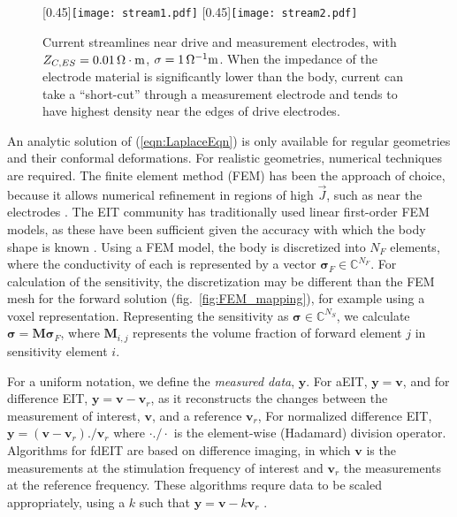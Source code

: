 \documentclass[10pt,journal]{IEEEtran}\def\TBLWIDA{15mm}\def\TBLWIDB{60mm}
\newcommand\fref[1]{fig.\ \ref{#1}}
\newcommand{\yB}{\mathbf{y}}
\newcommand{\vB}{\mathbf{v}}
\newcommand{\MB}{\mathbf{M}}
\newcommand{\sG}{\bm{\sigma}}
\begin{document}
\begin{figure}
\centering
   [0.45\columnwidth]{\texttt{[image: stream1.pdf]}}\hfil
   [0.45\columnwidth]{\texttt{[image: stream2.pdf]}}\\
\caption{%
Current streamlines near drive and measurement electrodes, with
$Z_{C,ES} = 0.01\,\Omega\cdot{\rm m}$, $\sigma=1\,\Omega^{-1}{\rm m}$. When the
impedance of the electrode material is significantly lower than the 
body, current can take a ``short-cut'' through a measurement electrode 
and tends to have highest density near the edges of drive electrodes.
}
\label{fig:electrode_currents}
\end{figure}


An analytic solution of (\ref{eqn:LaplaceEqn}) is only available for
regular geometries and their conformal deformations. For realistic
geometries, numerical techniques are required. The finite element
method (FEM) has been the approach of choice, because it allows
numerical refinement in regions of high $\vec{J}$, such as
near the electrodes \cite{Grychtol2013Refinement}. The EIT community
has traditionally used linear first-order FEM models, as these
have been sufficient given the accuracy with which
the body shape is known \cite{Grychtol2012Mismatch}.
Using a FEM model, the body is discretized into $N_F$ elements,
where the conductivity of each is represented by a vector
$\sG_F \in \mathbb{C}^{N_F}$.
For calculation of the sensitivity, the discretization may
be different than the FEM mesh for the forward solution (\fref{fig:FEM_mapping}),
 for example using a voxel representation.
Representing the sensitivity as $\sG \in \mathbb{C}^{N_S}$, 
we calculate $\sG = \MB \sG_F$, where $\MB_{i,j}$
represents the volume fraction of forward element $j$ in
sensitivity element $i$.

For a uniform notation, we define the {\em measured data}, $\yB$.
For aEIT, $\yB = \vB$, and for
difference EIT, $\yB= \vB - \vB_r$, as it reconstructs
the changes 
between the measurement of interest, $\vB$, and a reference $\vB_r$,
For normalized difference EIT, $\yB= (\vB - \vB_r) ./ \vB_r$
where $\cdot ./ \cdot$ is the element-wise (Hadamard) division operator.
Algorithms for fdEIT are based on difference imaging, in which
$\vB$ is the measurements at the stimulation frequency of
interest and
$\vB_r$ the measurements at the reference frequency. 
These algorithms requre data to be scaled appropriately,
using a $k$ such that
$\yB= \vB - k \vB_r$ \cite{Seo2008fdEIT}.
\end{document}
